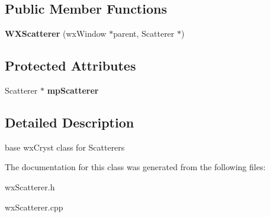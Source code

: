 \subsection*{Public Member Functions}
\begin{DoxyCompactItemize}
\item 
\mbox{\label{class_obj_cryst_1_1_w_x_scatterer_a43a37c79f9dca837a55fe024a06fddd6}} 
{\bfseries W\+X\+Scatterer} (wx\+Window $\ast$parent, Scatterer $\ast$)
\end{DoxyCompactItemize}
\subsection*{Protected Attributes}
\begin{DoxyCompactItemize}
\item 
\mbox{\label{class_obj_cryst_1_1_w_x_scatterer_a60b8f362b1735a8942e2991994d5c862}} 
Scatterer $\ast$ {\bfseries mp\+Scatterer}
\end{DoxyCompactItemize}


\subsection{Detailed Description}
base wx\+Cryst class for Scatterers 

The documentation for this class was generated from the following files\+:\begin{DoxyCompactItemize}
\item 
wx\+Scatterer.\+h\item 
wx\+Scatterer.\+cpp\end{DoxyCompactItemize}
